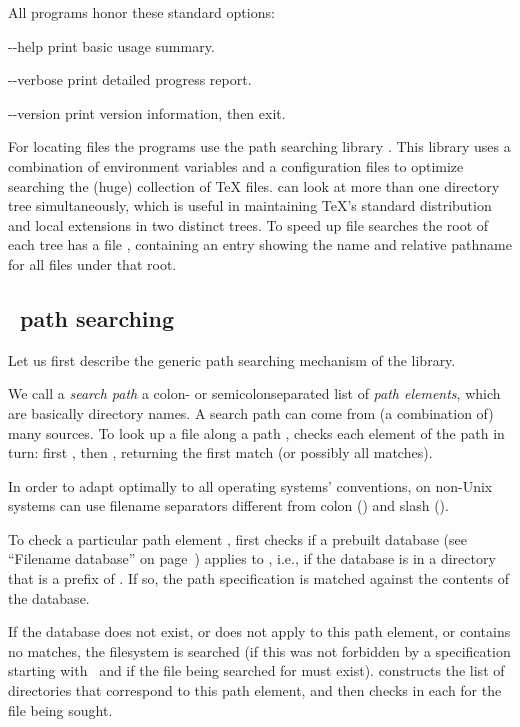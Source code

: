 \documentclass{article}
\begin{document}
All programs honor these standard  options:
\begin{ttdescription}
\item[-{}-help] print basic usage summary.
\item[-{}-verbose] print detailed progress report.
\item[-{}-version] print version information, then exit.
\end{ttdescription}

For locating files the \Webc{} programs use the path searching library
\KPS{}. This library uses a combination of environment variables and a
configuration files to optimize searching the (huge) collection of
\TeX{} files.  \Webc{} can look at more than one directory tree
simultaneously, which is useful in maintaining \TeX's standard
distribution and local extensions in two distinct trees. To speed up
file searches the root of each tree has a file , containing
an entry showing the name and relative pathname for all files under that
root.

\subsection{\protect\KPS\ path searching}

Let us first describe the generic path searching mechanism of the \KPS{}
library. 

We call a \emph{search path} a colon- or semicolon\hyph sepa\-rated list
of \emph{path elements}, which are basically directory names.  A
search path can come from (a combination of) many sources.  To look up
a file  along a path , \KPS{} checks each
element of the path in turn: first , then
, returning the first match (or possibly all
matches).

In order to adapt optimally to all operating systems' conventions, on
non-Unix systems \KPS{} can use filename separators different from
colon (\samp{:}) and slash (\samp{/}).

To check a particular path element , \KPS{} first checks if a
prebuilt database (see ``Filename data\-base'' on 
page~\pageref{Filename-database}) applies to , i.e., if the database
is in a directory that is a prefix of .  If so, the path
specification is matched against the contents of the database.

If the database does not exist, or does not apply to this path
element, or contains no matches, the filesystem is searched (if this
was not forbidden by a specification starting with \samp{!!}\ and if
the file being searched for must exist).  \KPS{} constructs the list
of directories that correspond to this path element, and then checks
in each for the file being sought.
\end{document}
